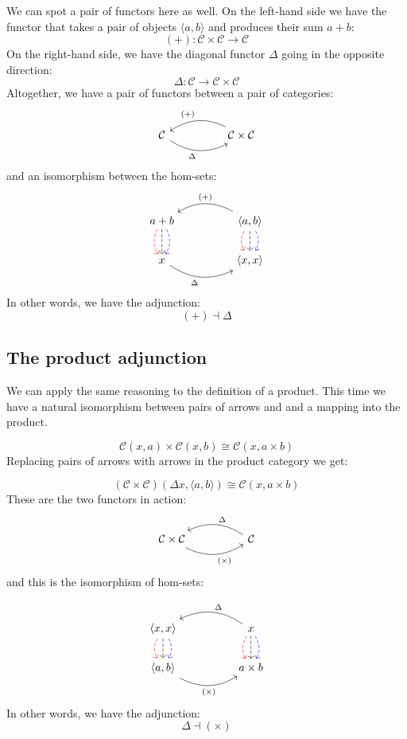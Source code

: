 \documentclass[DaoFP]{subfiles}
\begin{document}
We can spot a pair of functors here as well. On the left-hand side we have the functor that takes a pair of objects $\langle a, b \rangle$ and produces their sum $a + b$:
\[ (+) \colon \mathcal{C} \times \mathcal{C} \to \mathcal{C}\]
On the right-hand side, we have the diagonal functor $\Delta$ going in the opposite direction:
\[ \Delta \colon \mathcal{C} \to  \mathcal{C} \times \mathcal{C} \]
Altogether, we have a pair of functors between a pair of categories:
\[
 \begin{tikzcd}
  \mathcal{C}
   \arrow[rr, bend right, "\Delta"']
  &&
  \mathcal{C} \times \mathcal{C}
 \arrow[ll, bend right, "(+)"']
  \end{tikzcd}
\]
and an isomorphism between the hom-sets:
\[
 \begin{tikzcd}
a + b
\arrow[d, bend right, red, dashed]
\arrow[d, dashed]
\arrow[d, bend left, blue, dashed]
  &&
 \langle a , b \rangle
\arrow[d, bend right, red, dashed]
\arrow[d, dashed]
\arrow[d, bend left, blue, dashed]
 \arrow[ll, bend right, "(+)"']
 \\
 x
   \arrow[rr, bend right, "\Delta"']
 &&
 \langle x, x \rangle
  \end{tikzcd}
\]
In other words, we have the adjunction:
\[ (+) \dashv \Delta \]


\subsection{The product adjunction}

We can apply the same reasoning to the definition of a product. This time we have a natural isomorphism between pairs of arrows and and a mapping into the product.

\[  \mathcal{C} (x, a) \times \mathcal{C}(x, b) \cong  \mathcal{C} (x, a \times b)  \]
Replacing pairs of arrows with arrows in the product category we get:

\[  (\mathcal{C} \times \mathcal{C})( \Delta x,  \langle a, b \rangle ) \cong  \mathcal{C} (x, a \times b)  \]
These are the two functors in action:
\[
 \begin{tikzcd}
  \mathcal{C} \times \mathcal{C}
  \arrow[rr, bend right, "(\times)"']
  &&
  \mathcal{C}
  \arrow[ll, bend right, "\Delta"']
  \end{tikzcd}
\]
and this is the isomorphism of hom-sets:

\[
 \begin{tikzcd}
 \langle x, x \rangle
\arrow[d, bend right, red, dashed]
\arrow[d, dashed]
\arrow[d, bend left, blue, dashed]
  &&
  x
\arrow[d, bend right, red, dashed]
\arrow[d, dashed]
\arrow[d, bend left, blue, dashed]
 \arrow[ll, bend right, "\Delta"']
 \\
 \langle a , b \rangle
   \arrow[rr, bend right, "(\times)"']
 &&
 a \times b
  \end{tikzcd}
\]
In other words, we have the adjunction:
\[ \Delta \dashv (\times) \]
\end{document}
